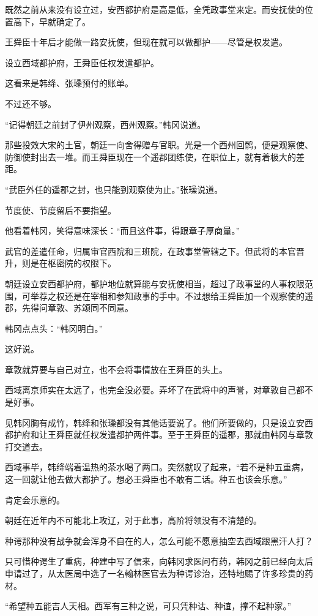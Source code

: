既然之前从来没有设立过，安西都护府是高是低，全凭政事堂来定。而安抚使的位置高下，早就确定了。

王舜臣十年后才能做一路安抚使，但现在就可以做都护——尽管是权发遣。

设立西域都护府，王舜臣任权发遣都护。

这看来是韩绛、张璪预付的账单。

不过还不够。

“记得朝廷之前封了伊州观察，西州观察。”韩冈说道。

那些投效大宋的土官，朝廷一向舍得赠与官职。光是一个西州回鹘，便是观察使、防御使封出去一堆。而王舜臣现在一个遥郡团练使，在职位上，就有着极大的差距。

“武臣外任的遥郡之封，也只能到观察使为止。”张璪说道。

节度使、节度留后不要指望。

他看着韩冈，笑得意味深长：“而且这件事，得跟章子厚商量。”

武官的差遣任命，归属审官西院和三班院，在政事堂管辖之下。但武将的本官晋升，则是在枢密院的权限下。

朝廷设立安西都护府，都护地位就算能与安抚使相当，超过了政事堂的人事权限范围，可举荐之权还是在宰相和参知政事的手中。不过想给王舜臣加一个观察使的遥郡，先得问章敦、苏颂同不同意。

韩冈点点头：“韩冈明白。”

这好说。

章敦就算要与自己对立，也不会将事情放在王舜臣的头上。

西域离京师实在太远了，也完全没必要。弄坏了在武将中的声誉，对章敦自己都不是好事。

见韩冈胸有成竹，韩绛和张璪都没有其他话要说了。他们所要做的，只是设立安西都护府和让王舜臣就任权发遣都护两件事。至于王舜臣的遥郡，那就由韩冈与章敦打交道去。

西域事毕，韩绛端着温热的茶水喝了两口。突然就叹了起来，“若不是种五重病，这一回就让他去做大都护了。想必王舜臣也不敢有二话。种五也该会乐意。”

肯定会乐意的。

朝廷在近年内不可能北上攻辽，对于此事，高阶将领没有不清楚的。

种谔那种没有战争就会浑身不自在的人，怎么可能不愿意抽空去西域跟黑汗人打？

只可惜种谔生了重病，种建中写了信来，向韩冈求医问冇药，韩冈之前已经向太后申请过了，从太医局中选了一名翰林医官去为种谔诊治，还特地赐了许多珍贵的药材。

“希望种五能吉人天相。西军有三种之说，可只凭种诂、种谊，撑不起种家。”

